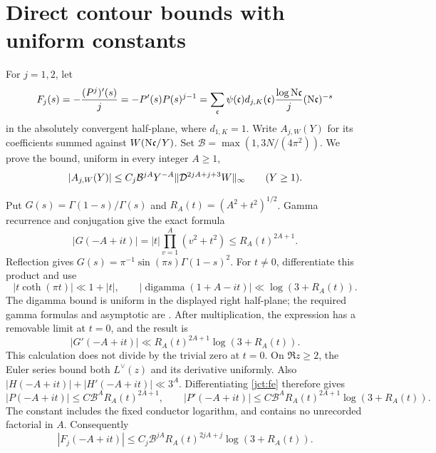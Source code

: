 \section{Direct contour bounds with uniform constants}
For \(j=1,2\), let
\begin{equation}
 F_j(s)=-\frac{(P^j)'(s)}j=-P'(s)P(s)^{j-1}
 =\sum_{\mathfrak c}\psi(\mathfrak c)d_{j,K}(\mathfrak c)
 \frac{\log\mathrm N\mathfrak c}{j}(\mathrm N\mathfrak c)^{-s}
 \label{jct:direct-series}
\end{equation}
in the absolutely convergent half-plane, where \(d_{1,K}=1\).
Write \(A_{j,W}(Y)\) for its coefficients summed against
\(W(\mathrm N\mathfrak c/Y)\).
Set \(\mathcal B=\max(1,3N/(4\pi^2))\).
We prove the bound, uniform in every integer \(A\ge1\),
\begin{equation}
 |A_{j,W}(Y)|\le C_j\mathcal B^{jA}Y^{-A}
 \|\mathcal D^{2jA+j+3}W\|_\infty\qquad(Y\ge1).
 \label{jct:uniform-direct}
\end{equation}

Put \(G(s)=\Gamma(1-s)/\Gamma(s)\) and
\(R_A(t)=(A^2+t^2)^{1/2}\).  Gamma recurrence and conjugation
give the exact formula
\begin{equation}
 |G(-A+it)|=|t|\prod_{v=1}^A(v^2+t^2)
 \le R_A(t)^{2A+1}.
 \label{jct:gamma}
\end{equation}
Reflection gives \(G(s)=\pi^{-1}\sin(\pi s)\Gamma(1-s)^2\).
For \(t\ne0\), differentiate this product and use
\[
 |t\coth(\pi t)|\ll1+|t|,\qquad
 |\operatorname{digamma}(1+A-it)|\ll\log(3+R_A(t)).
\]
The digamma bound is uniform in the displayed right half-plane;
the required gamma formulas and asymptotic are
\cite[5.5.1, 5.5.3, 5.11.2]{JCTDLMF}.
After multiplication, the expression has a removable limit at
\(t=0\), and the result is
\begin{equation}
 |G'(-A+it)|\ll R_A(t)^{2A+1}\log(3+R_A(t)).
 \label{jct:gamma-prime}
\end{equation}
This calculation does not divide by the trivial zero at \(t=0\).
On \(\Re z\ge2\), the Euler series bound both
\(L^\vee(z)\) and its derivative uniformly.
Also \(|H(-A+it)|+|H'(-A+it)|\ll3^A\).
Differentiating \eqref{jct:fe} therefore gives
\[
 |P(-A+it)|\le C\mathcal B^A R_A(t)^{2A+1},\qquad
 |P'(-A+it)|\le C\mathcal B^A R_A(t)^{2A+1}
                                      \log(3+R_A(t)).
\]
The constant includes the fixed conductor logarithm, and contains
no unrecorded factorial in \(A\).  Consequently
\begin{equation}
 |F_j(-A+it)|\le C_j\mathcal B^{jA}
 R_A(t)^{2jA+j}\log(3+R_A(t)).
 \label{jct:direct-strip}
\end{equation}

